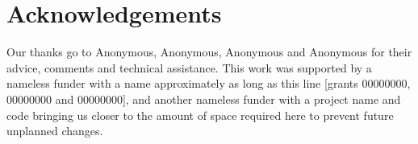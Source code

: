 \documentclass[10pt, times, conference, letterpaper]{IEEEtran}
\begin{document}
\section*{Acknowledgements}
Our thanks go to Anonymous, Anonymous, Anonymous and Anonymous for their advice, comments and technical assistance.
This work was supported by a nameless funder with a name approximately as long as this line [grants 00000000, 00000000 and 00000000], and another nameless funder with a project name and code bringing us closer to the amount of space required here to prevent future unplanned changes.

\renewcommand*{\bibfont}{\footnotesize}
\printbibliography
\end{document}

